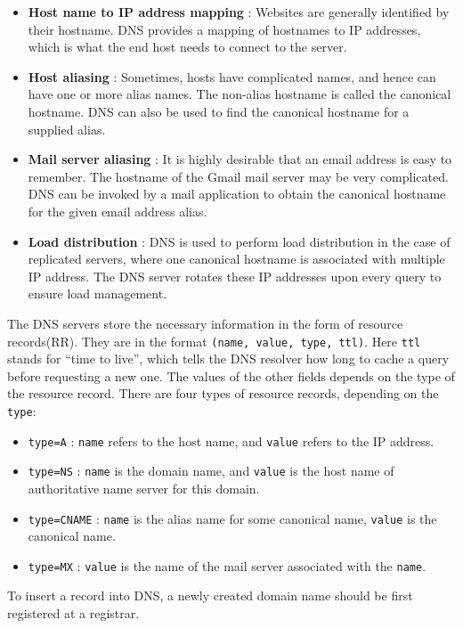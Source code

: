 \documentclass[12pt,letterpaper]{amsbook}
\theoremstyle{definition}
\begin{document}
\begin{itemize}
  \item \textbf{Host name to IP address mapping} : Websites are generally identified by their hostname. DNS provides a mapping of hostnames to IP addresses, which is what the end host needs to connect to the server.
  \item \textbf{Host aliasing} : Sometimes, hosts have complicated names, and hence can have one or more alias names. The non-alias hostname is called the canonical hostname. DNS can also be used to find the canonical hostname for a supplied alias.
  \item \textbf{Mail server aliasing} : It is highly desirable that an email address is easy to remember. The hostname of the Gmail mail server may be very complicated. DNS can be invoked by a mail application to obtain the canonical hostname for the given email address alias.
  \item \textbf{Load distribution} : DNS is used to perform load distribution in the case of replicated servers, where one canonical hostname is associated with multiple IP address. The DNS server rotates these IP addresses upon every query to ensure load management.
\end{itemize}

The DNS servers store the necessary information in the form of resource records(RR). They are in the format \texttt{(name, value, type, ttl)}. Here \texttt{ttl} stands for ``time to live'', which tells the DNS resolver how long to cache a query before requesting a new one. The values of the other fields depends on the type of the resource record. There are four types of resource records, depending on the \texttt{type}:

\begin{itemize}
  \item \texttt{type=A} : \texttt{name} refers to the host name, and \texttt{value} refers to the IP address.
  \item \texttt{type=NS} : \texttt{name} is the domain name, and \texttt{value} is the host name of authoritative name server for this domain.
  \item \texttt{type=CNAME} : \texttt{name} is the alias name for some canonical name, \texttt{value} is the canonical name.
\item \texttt{type=MX} : \texttt{value} is the name of the mail server associated with the \texttt{name}.
\end{itemize}

To insert a record into DNS, a newly created domain name should be first registered at a registrar.
\end{document}
